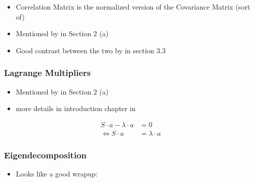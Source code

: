 \begin{itemize}
	\item Correlation Matrix is the normalized version of the Covariance Matrix (sort of)
	\item Mentioned by \cite{jolliffe2016principal} in Section 2 (a)
	\item Good contrast between the two by \cite{Jolliffe2002book} in section 3.3
\end{itemize}

\clearpage



\subsubsection{Lagrange Multipliers}

\begin{itemize}
	\item Mentioned by \cite{jolliffe2016principal} in Section 2 (a)
	\item more details in introduction chapter in \cite{Jolliffe2002book}
\end{itemize}

\begin{align}
	S \cdot a - \lambda \cdot a &= 0 \\
	\Leftrightarrow S \cdot a &= \lambda \cdot a
\end{align}

\clearpage


\subsubsection{Eigendecomposition}

\begin{itemize}
	\item Looks like a good wrapup: \cite{abdi2007eigen}
\end{itemize}

\clearpage


